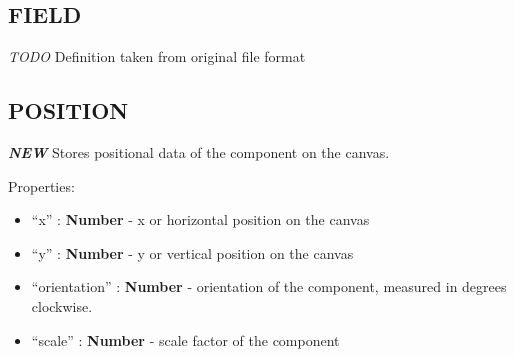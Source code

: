 \subsection{FIELD}\label{field}

\emph{TODO}
Definition taken from original file format

\subsection{POSITION}\label{position}

\textbf{\emph{NEW}} Stores positional data of the component on the
canvas.

Properties:

\begin{itemize}
\itemsep1pt\parskip0pt
\item
  ``x'' : \textbf{Number} - x or horizontal position on the canvas
\item
  ``y'' : \textbf{Number} - y or vertical position on the canvas
\item
  ``orientation'' : \textbf{Number} - orientation of the component,
  measured in degrees clockwise.
\item
  ``scale'' : \textbf{Number} - scale factor of the component
\end{itemize}
